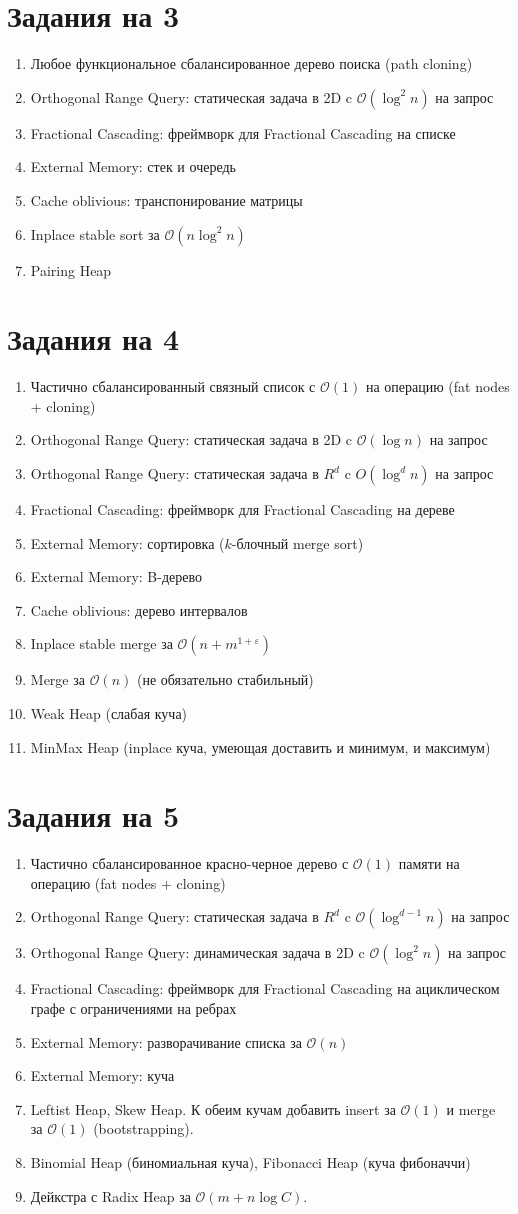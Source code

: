 \documentclass[12pt]{article}
\def\EPS{\varepsilon}
\def\O{\mathcal{O}}
\newenvironment{MyList}{
  \begin{enumerate}
  \setlength{\parskip}{-5pt}
  \setlength{\itemsep}{5pt}
}{
  \vspace*{-1em}
  \end{enumerate}
}
\newcommand\Section[1]{\vspace*{-1em}\section{#1}}
\begin{document}
\Section{Задания на 3}
\begin{MyList}
\item Любое функциональное сбалансированное дерево поиска (path cloning)
\item Orthogonal Range Query: статическая задача в 2D c $\O(\log^2 n)$ на запрос
\item Fractional Cascading: фреймворк для Fractional Cascading на списке
\item External Memory: стек и очередь
\item Cache oblivious: транспонирование матрицы
\item Inplace stable sort за $\O(n \log^2 n)$
\item Pairing Heap
\end{MyList}
\Section{Задания на 4}
\begin{MyList}
\item Частично сбалансированный связный список с $\O(1)$ на операцию (fat nodes + cloning)
\item Orthogonal Range Query: статическая задача в 2D c $\O(\log n)$ на запрос
\item Orthogonal Range Query: статическая задача в $R^d$ c $O(\log^d n)$ на запрос
\item Fractional Cascading: фреймворк для Fractional Cascading на дереве
\item External Memory: сортировка ($k$-блочный merge sort)
\item External Memory: B-дерево
\item Cache oblivious: дерево интервалов 
\item Inplace stable merge за $\O(n + m^{1 + \EPS})$
\item Merge за $\O(n)$ (не обязательно стабильный)
\item Weak Heap (слабая куча)
\item MinMax Heap (inplace куча, умеющая доставить и минимум, и максимум)
\end{MyList}
\Section{Задания на 5}
\begin{MyList}
\item Частично сбалансированное красно-черное дерево с $\O(1)$ памяти на операцию (fat nodes + cloning)
\item Orthogonal Range Query: статическая задача в $R^d$ c $\O(\log^{d-1}n)$ на запрос
\item Orthogonal Range Query: динамическая задача в 2D c $\O(\log^2 n)$ на запрос
\item Fractional Cascading: фреймворк для Fractional Cascading на ациклическом графе с ограничениями на ребрах
\item External Memory: разворачивание списка за $\O(n)$
\item External Memory: куча
\item Leftist Heap, Skew Heap. К обеим кучам добавить insert за $\O(1)$ и merge за $\O(1)$ (bootstrapping).
\item Binomial Heap (биномиальная куча), Fibonacci Heap (куча фибоначчи)
\item Дейкстра с Radix Heap за $\O(m + n \log C)$.
\end{MyList}
\end{document}

